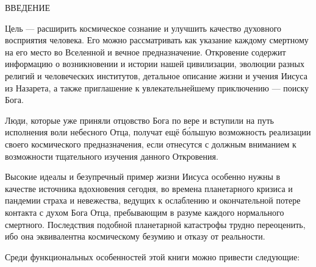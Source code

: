 \newpage
\thispagestyle{empty}
\fancyhead[C]{}

\makeatletter
{}%
\makeatother

\begin{center}
\bibpapertitlefont
ВВЕДЕНИЕ
\end{center}

\bibbookend

Цель  --- расширить космическое сознание
и улучшить качество духовного восприятия человека.
Его можно рассматривать как указание каждому смертному на его место во Вселенной и вечное предназначение.
Откровение содержит информацию о возникновении и истории нашей цивилизации, эволюции разных религий
и человеческих институтов, детальное описание жизни и учения Иисуса из Назарета,
а также приглашение к увлекательнейшему приключению --- поиску Бога.

Люди, которые уже приняли отцовство Бога по вере и вступили на путь исполнения воли небесного Отца, получат
ещё б\'ольшую возможность реализации своего космического предназначения, если отнесутся с должным вниманием
к возможности тщательного изучения данного Откровения.

Высокие идеалы и безупречный пример жизни Иисуса особенно нужны в качестве источника вдохновения сегодня,
во времена планетарного кризиса и пандемии страха и невежества,
ведущих к ослаблению и окончательной потере контакта с духом Бога Отца, пребывающим в разуме каждого нормального смертного.
Последствия подобной планетарной катастрофы трудно переоценить, ибо она эквивалентна космическому безумию и отказу от
реальности.

Среди функциональных особенностей этой книги можно привести следующие:

